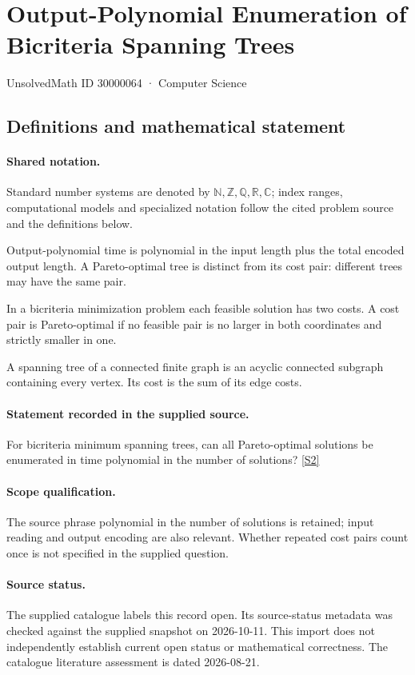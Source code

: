 \documentclass[11pt]{article}
\newcommand{\sref}[2]{\hyperlink{source:#1:#2}{[S#2]}}
\begin{document}
\setcounter{section}{30000063}
\section{Output-Polynomial Enumeration of Bicriteria Spanning Trees}\label{30000064}
{\small\sffamily UnsolvedMath ID 30000064 · Computer Science}
\subsection{Definitions and mathematical statement}

\paragraph{Shared notation.}Standard number systems are denoted by $\mathbb N,\mathbb Z,\mathbb Q,\mathbb R,\mathbb C$; index ranges, computational models and specialized notation follow the cited problem source and the definitions below.


Output-polynomial time is polynomial in the input length plus the total encoded output length. A Pareto-optimal tree is distinct from its cost pair: different trees may have the same pair.

In a bicriteria minimization problem each feasible solution has two costs. A cost pair is Pareto-optimal if no feasible pair is no larger in both coordinates and strictly smaller in one.

A spanning tree of a connected finite graph is an acyclic connected subgraph containing every vertex. Its cost is the sum of its edge costs.
\paragraph{Statement recorded in the supplied source.}
For bicriteria minimum spanning trees, can all Pareto-optimal solutions be enumerated in time polynomial in the number of solutions? \sref{30000064}{2}
\paragraph{Scope qualification.}
The source phrase polynomial in the number of solutions is retained; input reading and output encoding are also relevant. Whether repeated cost pairs count once is not specified in the supplied question.
\paragraph{Source status.}
The supplied catalogue labels this record open. Its source-status metadata was checked against the supplied snapshot on 2026-10-11. This import does not independently establish current open status or mathematical correctness. The catalogue literature assessment is dated 2026-08-21.
\end{document}
